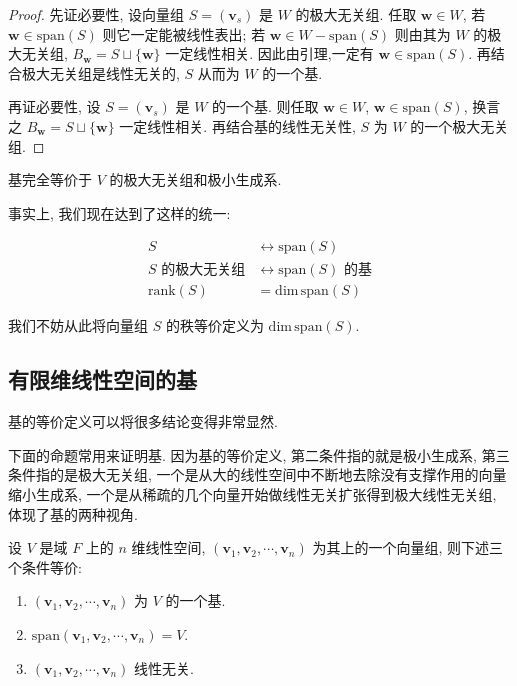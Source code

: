\documentclass[UTF8]{book}
\begin{document}
\begin{proof}
    先证必要性, 设向量组 $S=(\boldsymbol{v}_s)$ 是 $W$ 的极大无关组. 
    任取 $\boldsymbol{w} \in W$, 若 $\boldsymbol{w} \in \mathrm{span}(S)$ 
    则它一定能被线性表出; 若 $\boldsymbol{w} \in W- \mathrm{span}(S)$ 
    则由其为 $W$ 的极大无关组, 
    $B_{\boldsymbol{w}}=S \sqcup \{\boldsymbol{w}\}$ 一定线性相关.  
    因此由引理,一定有 $\boldsymbol{w} \in \mathrm{span}(S)$. 
    再结合极大无关组是线性无关的, $S$ 从而为 $W$ 的一个基. 

    再证必要性, 设 $S=(\boldsymbol{v}_s)$ 是 $W$ 的一个基. 
    则任取 $\boldsymbol{w} \in W$, $\boldsymbol{w} \in \mathrm{span}(S)$, 
    换言之 $B_{\boldsymbol{w}}=S \sqcup \{\boldsymbol{w}\}$ 一定线性相关. 
    再结合基的线性无关性, $S$ 为 $W$ 的一个极大无关组. 
\end{proof}

基完全等价于 $V$ 的极大无关组和极小生成系. 

事实上, 我们现在达到了这样的统一: 

\begin{center}
    $$\begin{aligned}
        S &\longleftrightarrow \mathrm{span}(S)\\
        S \mbox{ 的极大无关组} &\longleftrightarrow 
        \mathrm{span}(S) \mbox{ 的基}\\
        \mathrm{rank}(S) &= \mathrm{dim}\,  \mathrm{span}(S)  
    \end{aligned}$$
\end{center}

我们不妨从此将向量组 $S$ 的秩等价定义为 $\mathrm{dim}\,  \mathrm{span}(S)$. 

\subsection{有限维线性空间的基}

基的等价定义可以将很多结论变得非常显然. 

下面的命题常用来证明基. 
因为基的等价定义, 第二条件指的就是极小生成系, 第三条件指的是极大无关组, 
一个是从大的线性空间中不断地去除没有支撑作用的向量缩小生成系, 
一个是从稀疏的几个向量开始做线性无关扩张得到极大线性无关组, 
体现了基的两种视角. 

\begin{proposition}
    设 $V$ 是域 $F$ 上的 $n$ 维线性空间, 
    $(\boldsymbol{v}_1,\boldsymbol{v}_2,\cdots,\boldsymbol{v}_n)$ 
    为其上的一个向量组, 则下述三个条件等价: 
    \begin{enumerate}[(1)]
        \item $(\boldsymbol{v}_1,\boldsymbol{v}_2,\cdots,\boldsymbol{v}_n)$ 
        为 $V$ 的一个基. 
        \item $\mathrm{span}(\boldsymbol{v}_1,\boldsymbol{v}_2,\cdots,\boldsymbol{v}_n) = V$. 
        \item $(\boldsymbol{v}_1,\boldsymbol{v}_2,\cdots,\boldsymbol{v}_n)$ 
        线性无关. 
    \end{enumerate}
\end{proposition}
\end{document}
